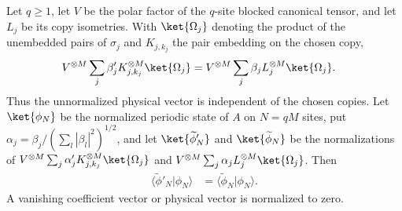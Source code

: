 \begin{lemma}
    \label{thm:ldp_corrected_canonical_physical}
    \leanok
    Let $q\geq1$, let $V$ be the polar factor of the $q$-site blocked
    canonical tensor, and let $L_j$ be its copy isometries. With
    $\ket{\Omega_j}$ denoting the product of the unembedded pairs of $\sigma_j$ and
    $K_{j,k_j}$ the pair embedding on the chosen copy,
    \begin{align}
        V^{\otimes M}\sum_j\beta'_jK_{j,k_j}^{\otimes M}\ket{\Omega_j}
         & =V^{\otimes M}\sum_j\beta_jL_j^{\otimes M}\ket{\Omega_j}.
    \end{align}
    Thus the unnormalized physical vector is independent of the chosen copies.
    Let $\ket{\phi_N}$ be the normalized periodic state of $A$ on $N=qM$ sites,
    put $\alpha_j=\beta_j/(\sum_l|\beta_l|^2)^{1/2}$, and let
    $\ket{\widetilde\phi'_N}$ and $\ket{\widetilde\phi_N}$ be the normalizations of
    $V^{\otimes M}\sum_j\alpha'_jK_{j,k_j}^{\otimes M}\ket{\Omega_j}$ and
    $V^{\otimes M}\sum_j\alpha_jL_j^{\otimes M}\ket{\Omega_j}$. Then
    \begin{align}
        \langle\widetilde\phi'_N|\phi_N\rangle
         & =\langle\widetilde\phi_N|\phi_N\rangle.
    \end{align}
    A vanishing coefficient vector or physical vector is normalized to zero.


\end{lemma}
